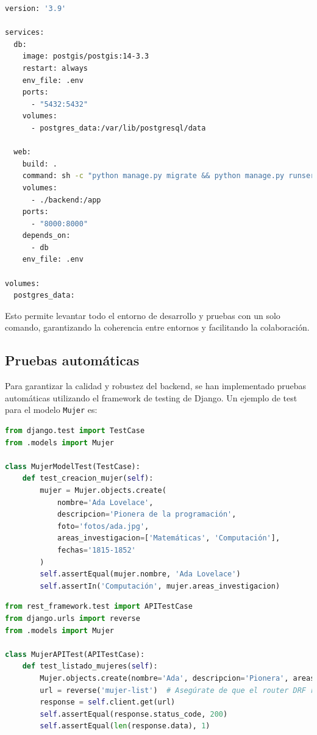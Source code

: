 \begin{lstlisting}[language=bash, caption={docker-compose.yml}]
version: '3.9'

services:
  db:
    image: postgis/postgis:14-3.3
    restart: always
    env_file: .env
    ports:
      - "5432:5432"
    volumes:
      - postgres_data:/var/lib/postgresql/data

  web:
    build: .
    command: sh -c "python manage.py migrate && python manage.py runserver 0.0.0.0:8000"
    volumes:
      - ./backend:/app
    ports:
      - "8000:8000"
    depends_on:
      - db
    env_file: .env

volumes:
  postgres_data:
\end{lstlisting}

Esto permite levantar todo el entorno de desarrollo y pruebas con un solo comando, garantizando la coherencia entre entornos y facilitando la colaboración.

\subsection{Pruebas automáticas}

Para garantizar la calidad y robustez del backend, se han implementado pruebas automáticas utilizando el framework de testing de Django. Un ejemplo de test para el modelo \texttt{Mujer} es:

\begin{lstlisting}[language=Python, caption={Test unitario para el modelo Mujer}]
from django.test import TestCase
from .models import Mujer

class MujerModelTest(TestCase):
    def test_creacion_mujer(self):
        mujer = Mujer.objects.create(
            nombre='Ada Lovelace',
            descripcion='Pionera de la programación',
            foto='fotos/ada.jpg',
            areas_investigacion=['Matemáticas', 'Computación'],
            fechas='1815-1852'
        )
        self.assertEqual(mujer.nombre, 'Ada Lovelace')
        self.assertIn('Computación', mujer.areas_investigacion)
\end{lstlisting}

\begin{lstlisting}[language=Python, caption={Test de API para el endpoint de mujeres}]
from rest_framework.test import APITestCase
from django.urls import reverse
from .models import Mujer

class MujerAPITest(APITestCase):
    def test_listado_mujeres(self):
        Mujer.objects.create(nombre='Ada', descripcion='Pionera', areas_investigacion=['Matemáticas'])
        url = reverse('mujer-list')  # Asegúrate de que el router DRF registre este nombre
        response = self.client.get(url)
        self.assertEqual(response.status_code, 200)
        self.assertEqual(len(response.data), 1)
\end{lstlisting}

